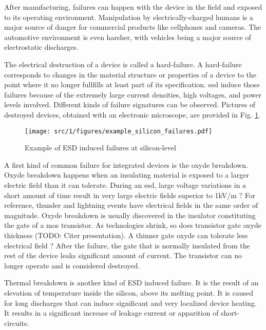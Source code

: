 After manufacturing, failures can happen with the device in the field and exposed to its operating environment.
Manipulation by electrically-charged humans is a major source of danger for commercial products like cellphones and cameras.
The automotive environment is even harsher, with vehicles being a major source of electrostatic discharges.

The electrical destruction of a device is called a hard-failure.
A hard-failure corresponds to changes in the material structure or properties of a device to the point where it no longer fullfills at least part of its specification.
\gls{esd} induce those failures because of the extremely large current densities, high voltages, and power levels involved.
Different kinds of failure signatures can be observed.
Pictures of destroyed devices, obtained with an electronic microscope, are provided in Fig. \ref{fig:silicon-level-failures}.

\begin{figure}[!h]
  \centering
  \texttt{[image: src/1/figures/example\_silicon\_failures.pdf]}
  \caption{Example of ESD induced failures at silicon-level}
  \label{fig:silicon-level-failures}
\end{figure}


A first kind of common failure for integrated devices is the oxyde breakdown.
Oxyde breakdown happens when an insulating material is exposed to a larger electric field than it can tolerate.
During an \gls{esd}, large voltage variations in a short amount of time result in very large electric fields superior to 1kV/m ?
For reference, thunder and lightning events have electrical fields in the same order of magnitude.
Oxyde breakdown is usually discovered in the insulator constituting the gate of a \gls{mos} transistor.
As technologies shrink, so does transistor gate oxyde thickness (TODO: Citer presentation).
A thinner gate oxyde can tolerate less electrical field ?
After the failure, the gate that is normally insulated from the rest of the device leaks significant amount of current.
The transistor can no longer operate and is considered destroyed.

Thermal breakdown is another kind of ESD induced failure.
It is the result of an elevation of temperature inside the silicon, above its melting point.
It is caused for long discharges that can induce significant and very localized device heating.
It results in a significant increase of leakage current or apparition of short-circuits.


